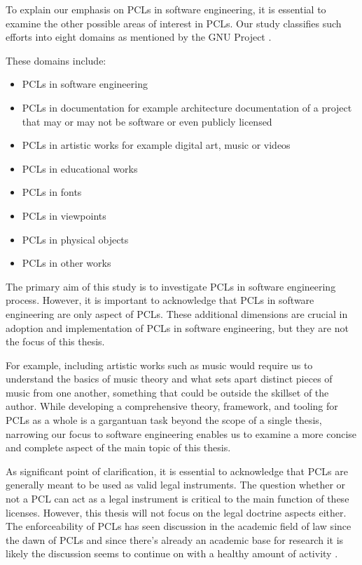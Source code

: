 To explain our emphasis on PCLs in software engineering, it is essential to examine the other possible areas of interest in PCLs. Our study classifies such efforts into eight domains as mentioned by the GNU Project .

These domains include:
\begin{itemize}
	\item PCLs in software engineering
	\item PCLs in documentation for example architecture documentation of a project that may or may not be software or even publicly licensed
	\item PCLs in artistic works for example digital art, music or videos
	\item PCLs in educational works
	\item PCLs in fonts
	\item PCLs in viewpoints
	\item PCLs in physical objects
	\item PCLs in other works
\end{itemize}

The primary aim of this study is to investigate PCLs in software engineering process. However, it is important to acknowledge that PCLs in software engineering are only aspect of PCLs. These additional dimensions are crucial in adoption and implementation of PCLs in software engineering, but they are not the focus of this thesis.

For example, including artistic works such as music would require us to understand the basics of music theory and what sets apart distinct pieces of music from one another, something that could be outside the skillset of the author. While developing a comprehensive theory, framework, and tooling for PCLs as a whole is a gargantuan task beyond the scope of a single thesis, narrowing our focus to software engineering enables us to examine a more concise and complete aspect of the main topic of this thesis. 

As significant point of clarification, it is essential to acknowledge that PCLs are generally meant to be used as valid legal instruments. The question whether or not a PCL can act as a legal instrument is critical to the main function of these licenses. However, this thesis will not focus on the legal doctrine aspects either. The enforceability of PCLs has seen discussion in the academic field of law since the dawn of PCLs and since there's already an academic base for research it is likely the discussion seems to continue on with a healthy amount of activity .

